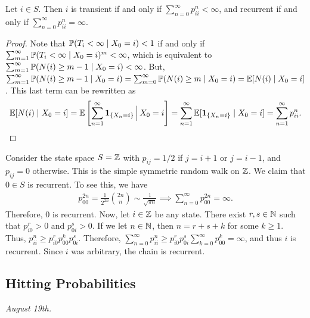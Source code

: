 \begin{proposition}
    Let $i \in S$. Then $i$ is transient if and only if $\sum_{n=0}^{\infty} p_{ii}^{n} < \infty$, and recurrent if and only if $\sum_{n=0}^{\infty} p_{ii}^{n} = \infty$.
\end{proposition}
\begin{proof}
    Note that $\mathbb{P}(T_{i} < \infty \mid X_{0} = i) < 1$ if and only if $\sum_{m=1}^{\infty} \mathbb{P}(T_{i} < \infty \mid X_{0} = i)^{m} < \infty$, which is equivalent to $\sum_{m=1}^{\infty} \mathbb{P}(N(i) \geq m-1 \mid X_{0} = i) < \infty$. But, $\sum_{m=1}^{\infty} \mathbb{P}(N(i) \geq m-1 \mid X_{0} = i) = \sum_{m=0}^{\infty} \mathbb{P}(N(i) \geq m \mid X_{0} = i) = \mathbb{E}[N(i) \mid X_{0} = i]$. This last term can be rewritten as
    \begin{align}
        \mathbb{E}[N(i) \mid X_{0} = i] = \mathbb{E}\left[\sum_{n=1}^{\infty} \textbf{1}_{\{X_{n} = i\}} \, \Big| \,  X_{0} = i\right] = \sum_{n=1}^{\infty} \mathbb{E}[\textbf{1}_{\{X_{n} = i\}} \mid X_{0} = i] = \sum_{n=1}^{\infty} p_{ii}^{n}.
    \end{align}
\end{proof}

\begin{example}
    Consider the state space $S = \mathbb{Z}$ with $p_{ij} = 1/2$ if $j = i+1$ or $j = i-1$, and $p_{ij} = 0$ otherwise. This is the simple symmetric random walk on $\mathbb{Z}$. We claim that $0 \in S$ is recurrent. To see this, we have
    \begin{align}
        p_{00}^{2n} = \frac{1}{2^{2n}}\binom{2n}{n} \sim \frac{1}{\sqrt{\pi n}} \implies \sum_{n=0}^{\infty} p_{00}^{2n} = \infty.
    \end{align}
    Therefore, $0$ is recurrent. Now, let $i \in \mathbb{Z}$ be any state. There exist $r,s \in \mathbb{N}$ such that $p_{i0}^{r} > 0$ and $p_{0i}^{s} > 0$. If we let $n \in \mathbb{N}$, then $n = r+s+k$ for some $k \geq 1$. Thus, $p_{ii}^{n} \geq p_{i0}^{r}p_{00}^{k}p_{0i}^{s}$. Therefore, $\sum_{n=0}^{\infty} p_{ii}^{n} \geq p_{i0}^{r}p_{0i}^{s}\sum_{k=0}^{\infty} p_{00}^{k} = \infty$, and thus $i$ is recurrent. Since $i$ was arbitrary, the chain is recurrent.
\end{example}


\subsection{Hitting Probabilities}
\textit{August 19th.}

